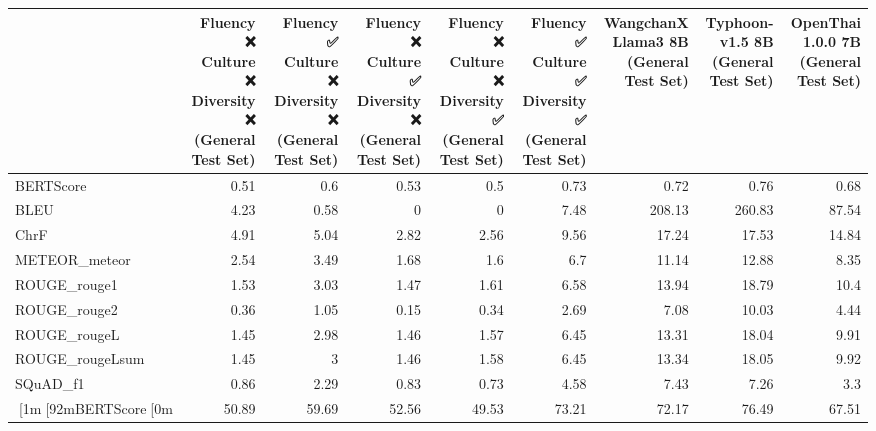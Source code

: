 \begin{tabular}{lrrrrrrrr}
\hline
                 &       Fluency ❌
 Culture ❌
 Diversity ❌
(General Test Set) &       Fluency ✅
 Culture ❌
 Diversity ❌
(General Test Set) &       Fluency ❌
 Culture ✅
 Diversity ❌
(General Test Set) &       Fluency ❌
 Culture ❌
 Diversity ✅
(General Test Set) &       Fluency ✅
 Culture ✅
 Diversity ✅
(General Test Set) &        WangchanX Llama3 8B
(General Test Set) &        Typhoon-v1.5 8B
(General Test Set) &       OpenThai 1.0.0 7B
(General Test Set) \\
\hline
 BERTScore       &  0.51 &  0.6  &  0.53 &  0.5  &  0.73 &   0.72 &   0.76 &  0.68 \\
 BLEU            &  4.23 &  0.58 &  0    &  0    &  7.48 & 208.13 & 260.83 & 87.54 \\
 ChrF            &  4.91 &  5.04 &  2.82 &  2.56 &  9.56 &  17.24 &  17.53 & 14.84 \\
 METEOR_meteor   &  2.54 &  3.49 &  1.68 &  1.6  &  6.7  &  11.14 &  12.88 &  8.35 \\
 ROUGE_rouge1    &  1.53 &  3.03 &  1.47 &  1.61 &  6.58 &  13.94 &  18.79 & 10.4  \\
 ROUGE_rouge2    &  0.36 &  1.05 &  0.15 &  0.34 &  2.69 &   7.08 &  10.03 &  4.44 \\
 ROUGE_rougeL    &  1.45 &  2.98 &  1.46 &  1.57 &  6.45 &  13.31 &  18.04 &  9.91 \\
 ROUGE_rougeLsum &  1.45 &  3    &  1.46 &  1.58 &  6.45 &  13.34 &  18.05 &  9.92 \\
 SQuAD_f1        &  0.86 &  2.29 &  0.83 &  0.73 &  4.58 &   7.43 &   7.26 &  3.3  \\
 [1m[92mBERTScore[0m       & 50.89 & 59.69 & 52.56 & 49.53 & 73.21 &  72.17 &  76.49 & 67.51 \\
\hline
\end{tabular}